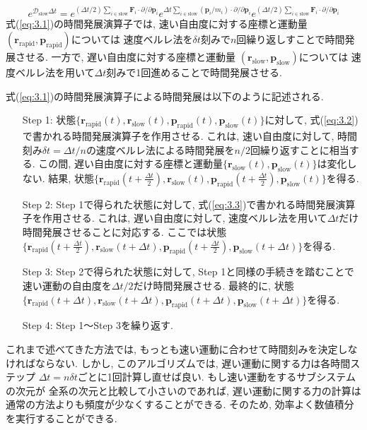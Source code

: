 \begin{equation}
 e^{\mathcal{D}_{\mathrm{slow}} \Delta t}
  = e^{
       (\Delta t/2) \sum_{i \in \mathrm{slow}} \bm{F}_{i}
       \cdot \partial/\partial \bm{p}_{i}
       }
    e^{
       \Delta t \sum_{i \in \mathrm{slow}} (\bm{p}_{i}/m_{i})
       \cdot \partial/\partial \bm{p}_{i}
       }
    e^{
       (\Delta t/2) \sum_{i \in \mathrm{slow}} \bm{F}_{i}
       \cdot \partial/\partial \bm{p}_{i}
       }
 \label{eq:3.3}
\end{equation}
式(\ref{eq:3.1})の時間発展演算子では, 速い自由度に対する座標と運動量
$(\bm{r}_{\mathrm{rapid}},\bm{p}_{\mathrm{rapid}})$については
速度ベルレ法を$\delta t$刻みで$n$回繰り返しすことで時間発展させる. 
一方で, 遅い自由度に対する座標と運動量
$(\bm{r}_{\mathrm{slow}},\bm{p}_{\mathrm{slow}})$については
速度ベルレ法を用いて$\Delta t$刻みで1回進めることで時間発展させる. 

式(\ref{eq:3.1})の時間発展演算子による時間発展は以下のように記述される. 
\begin{enumerate}
 \setlength{\leftskip}{0.4cm}
 \item[Step 1:]
  状態$\{\bm{r}_{\mathrm{rapid}}(t), \bm{r}_{\mathrm{slow}}(t), \bm{p}_{\mathrm{rapid}}(t), \bm{p}_{\mathrm{slow}}(t) \}$に対して, 式(\ref{eq:3.2})で書かれる時間発展演算子を作用させる. これは, 速い自由度に対して, 時間刻み$\delta t = \Delta t/n$の速度ベルレ法による時間発展を$n/2$回繰り返すことに相当する. この間, 遅い自由度に対する座標と運動量$\{\bm{r}_{\mathrm{slow}} (t), \bm{p}_{\mathrm{slow}}(t)\}$は変化しない. 結果, 状態$\{\bm{r}_{\mathrm{rapid}}(t+\frac{\Delta t}{2}), \bm{r}_{\mathrm{slow}}(t), \bm{p}_{\mathrm{rapid}}(t+\frac{\Delta t}{2}), \bm{p}_{\mathrm{slow}}(t) \}$を得る. 

 \item[Step 2:]
  Step 1で得られた状態に対して, 式(\ref{eq:3.3})で書かれる時間発展演算子を作用させる. これは, 遅い自由度に対して, 速度ベルレ法を用いて$\Delta t$だけ時間発展させることに対応する. 
  ここでは状態 $\{\bm{r}_{\mathrm{rapid}}(t+\frac{\Delta t}{2}), \bm{r}_{\mathrm{slow}}(t+\Delta t), \bm{p}_{\mathrm{rapid}}(t+\frac{\Delta t}{2}), \bm{p}_{\mathrm{slow}}(t+\Delta t) \}$を得る. 

 \item[Step 3:]
  Step 2で得られた状態に対して, Step 1と同様の手続きを踏むことで
  速い運動の自由度を$\Delta t/2$だけ時間発展させる. 
  最終的に, 状態$\{\bm{r}_{\mathrm{rapid}}(t+\Delta t), \bm{r}_{\mathrm{slow}}(t+\Delta t), \bm{p}_{\mathrm{rapid}}(t+\Delta t), \bm{p}_{\mathrm{slow}}(t+\Delta t) \}$を得る. 
 \item[Step 4:]
  Step 1〜Step 3を繰り返す. 
\end{enumerate}

これまで述べてきた方法では, もっとも速い運動に合わせて時間刻みを決定しなければならない. 
しかし, このアルゴリズムでは, 遅い運動に関する力は各時間ステップ
$\Delta t = n \delta t$ごとに1回計算し直せば良い. もし速い運動をするサブシステムの次元が
全系の次元と比較して小さいのであれば, 遅い運動に関する力の計算は通常の方法よりも頻度が少なくすることができる. 
そのため, 効率よく数値積分を実行することができる. 

\clearpage




